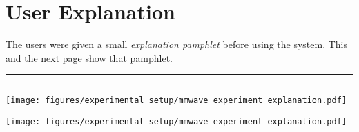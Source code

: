 \chapter{User Explanation}
\label{appendix: user explanation}

The users were given a small \textit{explanation pamphlet} before using the system.
This and the next page show that pamphlet. 

\vspace{2em}
\hrule
\vspace{0.2em}
\hrule


\texttt{[image: figures/experimental setup/mmwave experiment explanation.pdf]}

\texttt{[image: figures/experimental setup/mmwave experiment explanation.pdf]}